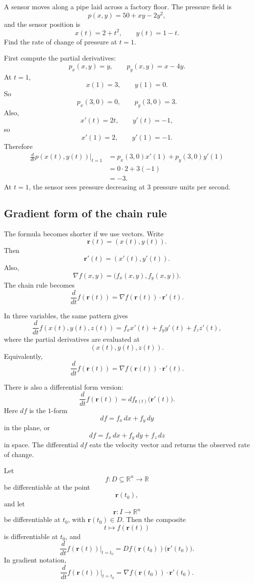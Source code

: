 \begin{example}
A sensor moves along a pipe laid across a factory floor.  The pressure field is
\[
    p(x,y)=50+xy-2y^2,
\]
and the sensor position is
\[
    x(t)=2+t^2,
    \qquad
    y(t)=1-t.
\]
Find the rate of change of pressure at \(t=1\).

First compute the partial derivatives:
\[
    p_x(x,y)=y,
    \qquad
    p_y(x,y)=x-4y.
\]
At \(t=1\),
\[
    x(1)=3,
    \qquad
    y(1)=0.
\]
So
\[
    p_x(3,0)=0,
    \qquad
    p_y(3,0)=3.
\]
Also,
\[
    x'(t)=2t,
    \qquad
    y'(t)=-1,
\]
so
\[
    x'(1)=2,
    \qquad
    y'(1)=-1.
\]
Therefore
\[
\begin{aligned}
    \frac{d}{dt}p(x(t),y(t))\bigg|_{t=1}
    &=
    p_x(3,0)x'(1)+p_y(3,0)y'(1)\\
    &=
    0\cdot2+3(-1)\\
    &=
    -3.
\end{aligned}
\]
At \(t=1\), the sensor sees pressure decreasing at \(3\) pressure units per second.
\end{example}

\subsection{Gradient form of the chain rule}

The formula becomes shorter if we use vectors.  Write
\[
    \mathbf r(t)=(x(t),y(t)).
\]
Then
\[
    \mathbf r'(t)=(x'(t),y'(t)).
\]
Also,
\[
    \nabla f(x,y)=\bigl(f_x(x,y),f_y(x,y)\bigr).
\]
The chain rule becomes
\[
\boxed{
    \frac{d}{dt}f(\mathbf r(t))
    =
    \nabla f(\mathbf r(t))\cdot \mathbf r'(t).
}
\]

In three variables, the same pattern gives
\[
\boxed{
    \frac{d}{dt}f(x(t),y(t),z(t))
    =
    f_xx'(t)+f_yy'(t)+f_zz'(t),
}
\]
where the partial derivatives are evaluated at
\[
    (x(t),y(t),z(t)).
\]
Equivalently,
\[
\boxed{
    \frac{d}{dt}f(\mathbf r(t))
    =
    \nabla f(\mathbf r(t))\cdot \mathbf r'(t).
}
\]

There is also a differential form version:
\[
\boxed{
    \frac{d}{dt}f(\mathbf r(t))
    =
    df_{\mathbf r(t)}\bigl(\mathbf r'(t)\bigr).
}
\]
Here \(df\) is the \(1\)-form
\[
    df=f_x\,dx+f_y\,dy
\]
in the plane, or
\[
    df=f_x\,dx+f_y\,dy+f_z\,dz
\]
in space.  The differential \(df\) eats the velocity vector and returns the observed
rate of change.

\begin{theorem}
Let
\[
    f:D\subseteq\mathbb R^n\to\mathbb R
\]
be differentiable at the point
\[
    \mathbf r(t_0),
\]
and let
\[
    \mathbf r:I\to\mathbb R^n
\]
be differentiable at \(t_0\), with \(\mathbf r(t_0)\in D\).  Then the composite
\[
    t\longmapsto f(\mathbf r(t))
\]
is differentiable at \(t_0\), and
\[
\boxed{
    \frac{d}{dt}f(\mathbf r(t))\bigg|_{t=t_0}
    =
    Df(\mathbf r(t_0))\bigl(\mathbf r'(t_0)\bigr).
}
\]
In gradient notation,
\[
\boxed{
    \frac{d}{dt}f(\mathbf r(t))\bigg|_{t=t_0}
    =
    \nabla f(\mathbf r(t_0))\cdot \mathbf r'(t_0).
}
\]
\end{theorem}

